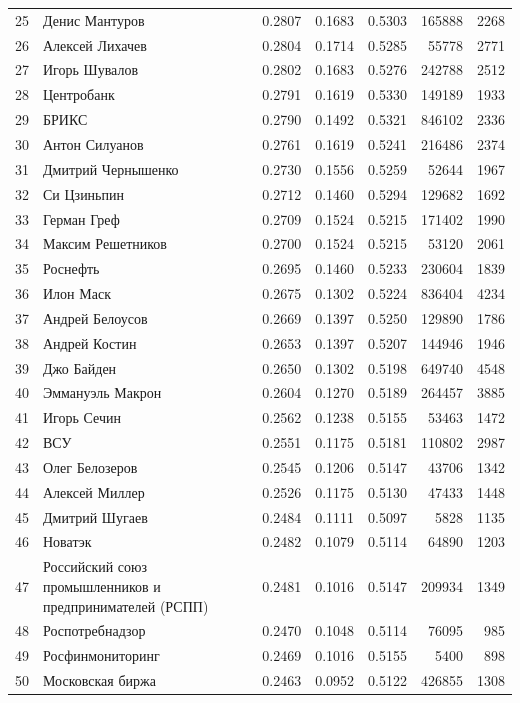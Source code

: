 {\begin{longtable}{r >{\raggedright\arraybackslash}p{4.2cm} S[table-format=1.4] S[table-format=1.4] S[table-format=1.4] r r}
25 & Денис Мантуров & 0.2807 & 0.1683 & 0.5303 & 165888 & 2268 \\
26 & Алексей Лихачев & 0.2804 & 0.1714 & 0.5285 & 55778 & 2771 \\
27 & Игорь Шувалов & 0.2802 & 0.1683 & 0.5276 & 242788 & 2512 \\
28 & Центробанк & 0.2791 & 0.1619 & 0.5330 & 149189 & 1933 \\
29 & БРИКС & 0.2790 & 0.1492 & 0.5321 & 846102 & 2336 \\
30 & Антон Силуанов & 0.2761 & 0.1619 & 0.5241 & 216486 & 2374 \\
31 & Дмитрий Чернышенко & 0.2730 & 0.1556 & 0.5259 & 52644 & 1967 \\
32 & Си Цзиньпин & 0.2712 & 0.1460 & 0.5294 & 129682 & 1692 \\
33 & Герман Греф & 0.2709 & 0.1524 & 0.5215 & 171402 & 1990 \\
34 & Максим Решетников & 0.2700 & 0.1524 & 0.5215 & 53120 & 2061 \\
35 & Роснефть & 0.2695 & 0.1460 & 0.5233 & 230604 & 1839 \\
36 & Илон Маск & 0.2675 & 0.1302 & 0.5224 & 836404 & 4234 \\
37 & Андрей Белоусов & 0.2669 & 0.1397 & 0.5250 & 129890 & 1786 \\
38 & Андрей Костин & 0.2653 & 0.1397 & 0.5207 & 144946 & 1946 \\
39 & Джо Байден & 0.2650 & 0.1302 & 0.5198 & 649740 & 4548 \\
40 & Эммануэль Макрон & 0.2604 & 0.1270 & 0.5189 & 264457 & 3885 \\
41 & Игорь Сечин & 0.2562 & 0.1238 & 0.5155 & 53463 & 1472 \\
42 & ВСУ & 0.2551 & 0.1175 & 0.5181 & 110802 & 2987 \\
43 & Олег Белозеров & 0.2545 & 0.1206 & 0.5147 & 43706 & 1342 \\
44 & Алексей Миллер & 0.2526 & 0.1175 & 0.5130 & 47433 & 1448 \\
45 & Дмитрий Шугаев & 0.2484 & 0.1111 & 0.5097 & 5828 & 1135 \\
46 & Новатэк & 0.2482 & 0.1079 & 0.5114 & 64890 & 1203 \\
47 & Российский союз промышленников и предпринимателей (РСПП) & 0.2481 & 0.1016 & 0.5147 & 209934 & 1349 \\
48 & Роспотребнадзор & 0.2470 & 0.1048 & 0.5114 & 76095 & 985 \\
49 & Росфинмониторинг & 0.2469 & 0.1016 & 0.5155 & 5400 & 898 \\
50 & Московская биржа & 0.2463 & 0.0952 & 0.5122 & 426855 & 1308 \\
\end{longtable}
}

